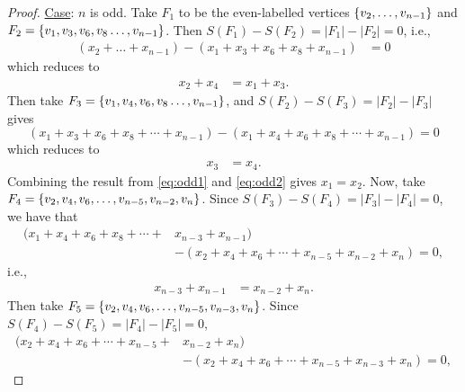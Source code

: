 \begin{proof}
\noindent
\underline{Case}: $n$ is odd. 
Take $F_1$ to be the even-labelled vertices $\{ v_2, \dots, v_{n-1} \}$ and $F_2 = \{ v_1, v_3, v_6, v_8 \dots, v_{n-1} \}$. Then $S(F_1) -S(F_2) = |F_1| - |F_2| = 0$, i.e.,
\begin{equation*}
\begin{aligned}
(x_2 + \dots + x_{n-1}) - (x_1 + x_3 + x_6 + x_8 + x_{n-1}) &= 0 
\end{aligned}
\end{equation*}
which reduces to
\begin{equation}\label{eq:odd1}
\begin{aligned} 
x_2 + x_4 &= x_1 + x_3.
\end{aligned}
\end{equation}
Then take $F_3 = \{ v_1, v_4, v_6, v_8 \dots, v_{n-1} \}$, and $S(F_2) -S(F_3) = |F_2| - |F_3|$ gives
$$
(x_1 + x_3 + x_6 + x_8 + \cdots + x_{n-1}) - (x_1 + x_4 + x_6 + x_8 + \cdots + x_{n-1}) = 0
$$
which reduces to
\begin{equation}
\begin{aligned}
\label{eq:odd2}
x_3 &= x_4.
\end{aligned}
\end{equation}
Combining the result from \eqref{eq:odd1} and \eqref{eq:odd2} gives $x_1 = x_2$. Now, take $F_4 = \{ v_2, v_4, v_6, \allowbreak \dots,  v_{n-5}, v_{n-2}, v_n \}$. Since $S(F_3) -S(F_4) = |F_3| - |F_4| = 0$, we have that
\begin{equation*}
\begin{aligned}
(x_1 + x_4 + x_6 + x_8 + \cdots + &x_{n-3} + x_{n-1}) \\ &- (x_2 + x_4 + x_6 + \cdots+ x_{n-5} + x_{n-2}+ x_n) = 0, 
\end{aligned}
\end{equation*}
i.e.,
\begin{equation}
\begin{aligned}\label{odd3}
x_{n-3} + x_{n-1} &= x_{n-2} + x_n.
\end{aligned}
\end{equation}
Then take $F_5 =\{  v_2, v_4, v_6, \dots, v_{n-5}, v_{n-3}, v_n \}$. Since $S(F_4) -S(F_5) = |F_4| - |F_5| = 0$,
\begin{equation*}
\begin{aligned}
(x_2+ x_4+ x_6 + \cdots + x_{n-5} + &x_{n-2}+ x_n)  \\ &- (x_2+ x_4+ x_6 + \cdots + x_{n-5} + x_{n-3}+ x_n) = 0, 
\end{aligned}
\end{equation*}

\end{proof}
